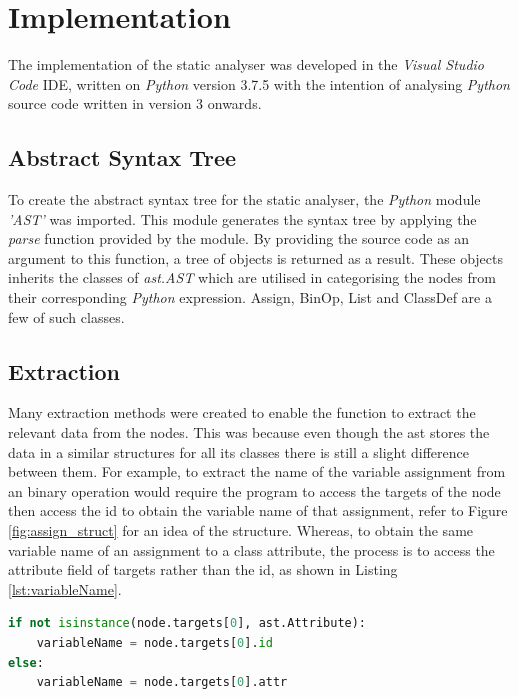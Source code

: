 \documentclass{l4proj}
\begin{document}
\chapter{Implementation}
The implementation of the static analyser was developed in the \emph{Visual Studio Code} IDE, written on \emph{Python} version 3.7.5 with the intention of analysing \emph{Python} source code written in version 3 onwards.

\section{Abstract Syntax Tree}
To create the abstract syntax tree for the static analyser, the \emph{Python} module \textit{'AST'} was imported. This module generates the syntax tree by applying the \textit{parse} function provided by the module. By providing the source code as an argument to this function, a tree of objects is returned as a result. These objects inherits the classes of \textit{ast.AST} which are utilised in categorising the nodes from their corresponding \emph{Python} expression. Assign, BinOp, List and ClassDef are a few of such classes.

\section{Extraction}
Many extraction methods were created to enable the function to extract the relevant data from the nodes. This was because even though the ast stores the data in a similar structures for all its classes there is still a slight difference between them. For example, to extract the name of the variable assignment from an binary operation would require the program to access the targets of the node then access the id to obtain the variable name of that assignment, refer to Figure \ref{fig:assign_struct} for an idea of the structure. Whereas, to obtain the same variable name of an assignment to a class attribute, the process is to access the attribute field of targets rather than the id, as shown in Listing \ref{lst:variableName}. 

\begin{lstlisting}[language=Python, caption= Code snippet of extracting the variable name of a node, label ={lst:variableName}]
if not isinstance(node.targets[0], ast.Attribute):
    variableName = node.targets[0].id
else:
    variableName = node.targets[0].attr
\end{lstlisting}
\end{document}
